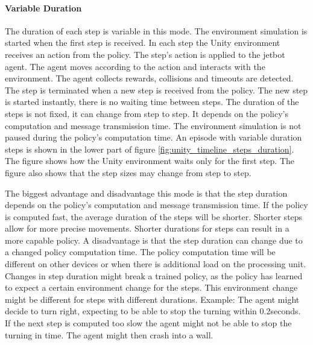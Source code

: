 


\paragraph{Variable Duration}

The duration of each step is variable in this mode. The environment simulation is started when the first step is received. In each step the Unity environment receives an action from the policy. The step's action is applied to the jetbot agent. The agent moves according to the action and interacts with the environment. The agent collects rewards, collisions and timeouts are detected. The step is terminated when a new step is received from the policy. The new step is started instantly, there is no waiting time between steps. 
The duration of the steps is not fixed, it can change from step to step. It depends on the policy's computation and message transmission time. The environment simulation is not paused during the policy's computation time. 
An episode with variable duration steps is shown in the lower part of figure \ref{fig:unity_timeline_steps_duration}. The figure shows how the Unity environment waits only for the first step. The figure also shows that the step sizes may change from step to step.

The biggest advantage and disadvantage this mode is that the step duration depends on the policy's computation and message transmission time. If the policy is computed fast, the average duration of the steps will be shorter. Shorter steps allow for more precise movements. Shorter durations for steps can result in a more capable policy.
A disadvantage is that the step duration can change due to a changed policy computation time. The policy computation time will be different on other devices or when there is additional load on the processing unit.
Changes in step duration might break a trained policy, as the policy has learned to expect a certain environment change for the steps. This environment change might be different for steps with different durations. 
Example: The agent might decide to turn right, expecting to be able to stop the turning within 0.2seconds. If the next step is computed too slow the agent might not be able to stop the turning in time. The agent might then crash into a wall.


